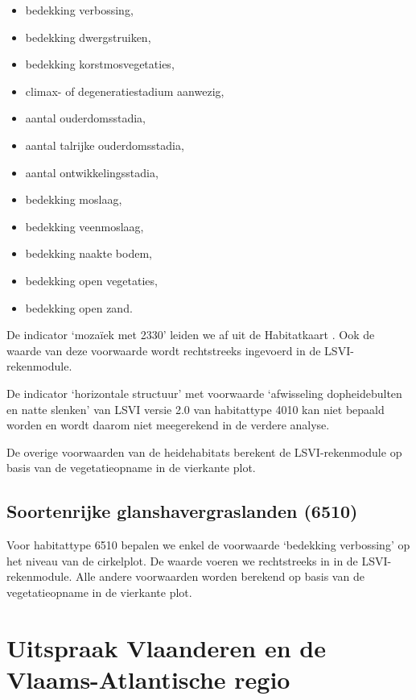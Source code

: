 \documentclass[twoside]{extreport}
\begin{document}
\begin{itemize}
\tightlist
\item
  bedekking verbossing,
\item
  bedekking dwergstruiken,
\item
  bedekking korstmosvegetaties,
\item
  climax- of degeneratiestadium aanwezig,
\item
  aantal ouderdomsstadia,
\item
  aantal talrijke ouderdomsstadia,
\item
  aantal ontwikkelingsstadia,
\item
  bedekking moslaag,
\item
  bedekking veenmoslaag,
\item
  bedekking naakte bodem,
\item
  bedekking open vegetaties,
\item
  bedekking open zand.
\end{itemize}

De indicator `mozaïek met 2330' leiden we af uit de Habitatkaart
\citep{DeSaeger2018}. Ook de waarde van deze voorwaarde wordt
rechtstreeks ingevoerd in de LSVI-rekenmodule.

De indicator `horizontale structuur' met voorwaarde `afwisseling
dopheidebulten en natte slenken' van LSVI versie 2.0 van habitattype
4010 kan niet bepaald worden en wordt daarom niet meegerekend in de
verdere analyse.

De overige voorwaarden van de heidehabitats berekent de LSVI-rekenmodule
op basis van de vegetatieopname in de vierkante plot.

\subsection{Soortenrijke glanshavergraslanden
(6510)}\label{soortenrijke-glanshavergraslanden-6510}

Voor habitattype 6510 bepalen we enkel de voorwaarde `bedekking
verbossing' op het niveau van de cirkelplot. De waarde voeren we
rechtstreeks in in de LSVI-rekenmodule. Alle andere voorwaarden worden
berekend op basis van de vegetatieopname in de vierkante plot.

\section{Uitspraak Vlaanderen en de Vlaams-Atlantische
regio}\label{uitspraak-vlaanderen-en-de-vlaams-atlantische-regio-1}
\end{document}
